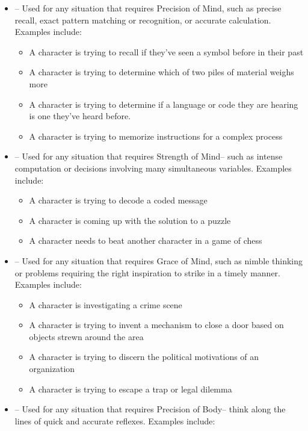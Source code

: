 \begin{GRPquicknotewide}
%
\begin{itemize}
	\item {}-- Used for any situation that requires Precision of Mind, such as precise recall, exact pattern matching or recognition, or accurate calculation. Examples include:
		\begin{itemize}
			\item A character is trying to recall if they've seen a symbol before in their past
			\item A character is trying to determine which of two piles of material weighs more
			\item A character is trying to determine if a language or code they are hearing is one they've heard before.
			\item A character is trying to memorize instructions for a complex process
		\end{itemize}
	\item {}-- Used for any situation that requires Strength of Mind-- such as intense computation or decisions involving many simultaneous variables. Examples include:
		\begin{itemize}
			\item A character is trying to decode a coded message
			\item A character is coming up with the solution to a puzzle
			\item A character needs to beat another character in a game of chess
		\end{itemize}
	\item {}-- Used for any situation that requires Grace of Mind, such as nimble thinking or problems requiring the right inspiration to strike in a timely manner. Examples include:
		\begin{itemize}
			\item A character is investigating a crime scene
			\item A character is trying to invent a mechanism to close a door based on objects strewn around the area
			\item A character is trying to discern the political motivations of an organization
			\item A character is trying to escape a trap or legal dilemma
		\end{itemize}
	\item {}-- Used for any situation that requires Precision of Body-- think along the lines of quick and accurate reflexes. Examples include:

\end{itemize}
\end{GRPquicknotewide}
